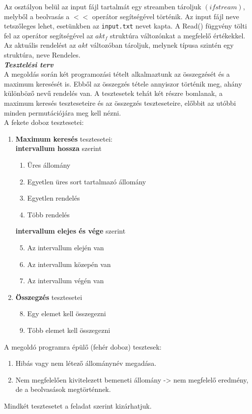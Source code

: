 \documentclass[12pt,a4paper]{article}			%
\newcommand{\fejezet}[1]{\noindent \textbf{\textit{\large #1 \vspace{5mm}}}}
\begin{document}
		\indent Az osztályon belül az input fájl tartalmát egy streamben tároljuk $(ifstream)$, melyből a beolvasás a $<<$ operátor segítségével történik. Az input fájl neve tetszőleges lehet, esetünkben az \texttt{input.txt} nevet kapta. A Read() függvény tölti fel az operátor segítségével az $akt_f$ struktúra változónkat a megfelelő értékekkel.\\
		\indent Az aktuális rendelést az $akt$ változóban tároljuk, melynek típusa szintén egy struktúra, neve Rendeles.
	\vspace{5mm}\\
	\fejezet{Tesztelési terv}\\
	\indent A megoldás során két programozási tételt alkalmaztunk az összegzését és a maximum keresését is. Ebből az összegzés tétele annyiszor történik meg, ahány különböző nevű rendelés van. A tesztesetek tehát két részre bomlanak, a maximum keresés teszteseteire és az összegzés teszteseteire, előbbit az utóbbi minden permutációjára meg kell nézni.
	\vspace{2mm}\\
	A fekete doboz tesztesetei:
	\renewcommand{\labelenumi}{\Alph{enumi}.}
	\renewcommand{\labelenumii}{\arabic{enumii}.}
	\begin{enumerate}
		\item \textbf{Maximum keresés} tesztesetei:\\
			\textbf{intervallum hossza} szerint
			\begin{enumerate}
				\item Üres állomány 
				\item Egyetlen üres sort tartalmazó állomány
				\item Egyetlen rendelés
				\item Több rendelés
			\end{enumerate}
			\textbf{intervallum elejes és vége} szerint
			\begin{enumerate}
				\setcounter{enumii}{4}
				\item Az intervallum elején van
				\item Az intervallum közepén van 
				\item Az intervallum végén van
			\end{enumerate}
		\item \textbf{Összegzés} tesztesetei
			\begin{enumerate}
				\setcounter{enumii}{7}
				\item Egy elemet kell összegezni
				\item Több elemet kell összegezni
			\end{enumerate}
	\end{enumerate}
	\vspace{2mm}
	A megoldó programra épülő (fehér doboz) tesztesek:
	\renewcommand{\labelenumi}{\arabic{enumi}.}
	\begin{enumerate}
		\item Hibás vagy nem létező állománynév megadása.
		\item Nem megfelelően kivitelezett bemeneti állomány -> nem megfelelő eredmény, de a beolvasások megtörténnek.
	\end{enumerate}
	Mindkét tesztesetet a feladat szerint kizárhatjuk.
\end{document}
